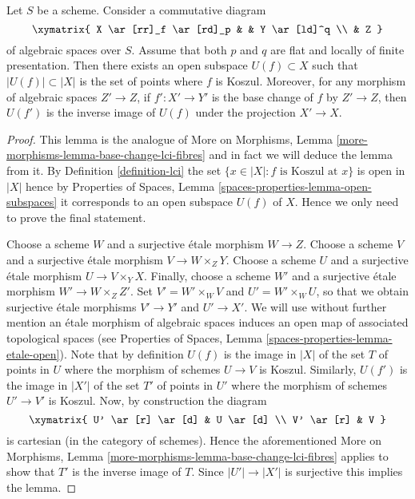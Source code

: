 \begin{lemma}
\label{lemma-base-change-lci-fibres}
Let $S$ be a scheme. Consider a commutative diagram
$$
\xymatrix{
X \ar[rr]_f \ar[rd]_p & & Y \ar[ld]^q \\
& Z
}
$$
of algebraic spaces over $S$. Assume that both $p$ and $q$
are flat and locally of finite presentation.
Then there exists an open subspace $U(f) \subset X$
such that $|U(f)| \subset |X|$ is the set of points where $f$ is Koszul.
Moreover, for any morphism of algebraic spaces $Z' \to Z$, if
$f' : X' \to Y'$ is the base change of $f$ by $Z' \to Z$, then
$U(f')$ is the inverse image of $U(f)$ under the projection $X' \to X$.
\end{lemma}

\begin{proof}
This lemma is the analogue of
More on Morphisms, Lemma \ref{more-morphisms-lemma-base-change-lci-fibres}
and in fact we will deduce the lemma from it. By
Definition \ref{definition-lci}
the set $\{x \in |X| : f \text{ is Koszul at }x\}$ is
open in $|X|$ hence by
Properties of Spaces, Lemma \ref{spaces-properties-lemma-open-subspaces}
it corresponds to an open subspace $U(f)$ of $X$. Hence we only need to
prove the final statement.

\medskip\noindent
Choose a scheme $W$ and a surjective \'etale morphism $W \to Z$.
Choose a scheme $V$ and a surjective \'etale morphism $V \to W \times_Z Y$.
Choose a scheme $U$ and a surjective \'etale morphism $U \to V \times_Y X$.
Finally, choose a scheme $W'$ and a surjective \'etale morphism
$W' \to W \times_Z Z'$.
Set $V' = W' \times_W V$ and $U' = W' \times_W U$, so that we obtain
surjective \'etale morphisms $V' \to Y'$ and $U' \to X'$.
We will use without further mention an \'etale morphism of algebraic spaces
induces an open map of associated topological spaces (see
Properties of Spaces, Lemma
\ref{spaces-properties-lemma-etale-open}).
Note that by definition $U(f)$ is the image in $|X|$ of the set $T$
of points in $U$ where the morphism of schemes $U \to V$ is Koszul.
Similarly, $U(f')$ is the image in $|X'|$ of the set $T'$ of points in
$U'$ where the morphism of schemes $U' \to V'$ is Koszul. Now, by construction
the diagram
$$
\xymatrix{
U' \ar[r] \ar[d] & U \ar[d] \\
V' \ar[r] & V
}
$$
is cartesian (in the category of schemes). Hence the aforementioned
More on Morphisms, Lemma \ref{more-morphisms-lemma-base-change-lci-fibres}
applies to show that $T'$ is the inverse image of $T$. Since
$|U'| \to |X'|$ is surjective this implies the lemma.
\end{proof}

